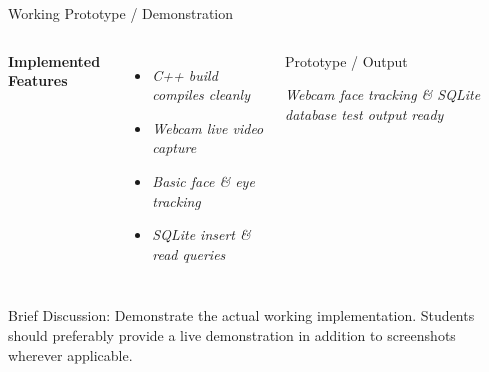 \documentclass[aspectratio=169,11pt]{beamer}
\newcommand{\smallnote}[1]{%
\vspace{0.08cm}
{\scriptsize\color{GEUGrey}#1}
}
\newcommand{\placeholder}[1]{%
\textit{\color{GEUGrey}#1}
}
\begin{document}
\begin{frame}{Working Prototype / Demonstration}

\begin{columns}[T,totalwidth=\textwidth]


\textbf{\color{GEUBlue}Implemented Features}

\begin{itemize}\itemsep3pt
\item \placeholder{C++ build compiles cleanly}
\item \placeholder{Webcam live video capture}
\item \placeholder{Basic face \& eye tracking}
\item \placeholder{SQLite insert \& read queries}
\end{itemize}


\begin{block}{Prototype / Output}

\centering
\vspace{8mm}

\placeholder{
Webcam face tracking \& SQLite
database test output ready
}

\vspace{8mm}

\end{block}

\end{columns}

\vfill

\smallnote{
Brief Discussion: Demonstrate the actual working implementation.
Students should preferably provide a live demonstration in addition
to screenshots wherever applicable.
}

\end{frame}
\end{document}
